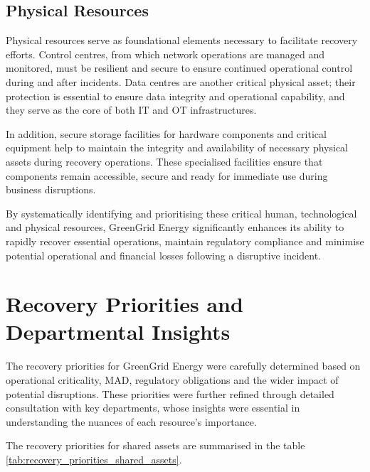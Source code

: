 \subsection{Physical Resources}

Physical resources serve as foundational elements necessary to facilitate recovery efforts. Control centres, from which network operations are managed and monitored, must be resilient and secure to ensure continued operational control during and after incidents. Data centres are another critical physical asset; their protection is essential to ensure data integrity and operational capability, and they serve as the core of both \ac{IT} and \ac{OT} infrastructures.

In addition, secure storage facilities for hardware components and critical equipment help to maintain the integrity and availability of necessary physical assets during recovery operations. These specialised facilities ensure that components remain accessible, secure and ready for immediate use during business disruptions.

By systematically identifying and prioritising these critical human, technological and physical resources, GreenGrid Energy significantly enhances its ability to rapidly recover essential operations, maintain regulatory compliance and minimise potential operational and financial losses following a disruptive incident.


\section{Recovery Priorities and Departmental Insights}

The recovery priorities for GreenGrid Energy were carefully determined based on operational criticality, \ac{MAD}, regulatory obligations and the wider impact of potential disruptions. These priorities were further refined through detailed consultation with key departments, whose insights were essential in understanding the nuances of each resource's importance.

The recovery priorities for shared assets are summarised in the table \ref{tab:recovery_priorities_shared_assets}.

